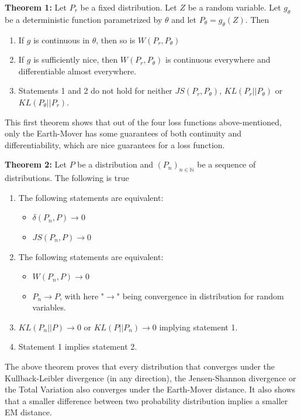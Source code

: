 \documentclass[11pt,a4paper,twoside]{report}
\begin{document}
\textbf{Theorem 1:} Let $P_r$ be a fixed distribution. Let $Z$ be a random variable. Let $g_{\theta}$ be a deterministic function parametrized by $\theta$ and let $P_{\theta} = g_{\theta}(Z)$. Then

\begin{enumerate}
    \item If $g$ is continuous in $\theta$, then so is $W(P_r, P_{\theta})$
    \item If $g$ is sufficiently nice, then $W(P_r, P_{\theta})$ is continuous everywhere and differentiable almost everywhere.
    \item Statements 1 and 2 do not hold for neither $JS(P_r, P_{\theta})$, $KL(P_r||P_{\theta})$ or $KL(P_{\theta}||P_r)$.
\end{enumerate}

This first theorem shows that out of the four loss functions above-mentioned, only the Earth-Mover has some guarantees of both continuity and differentiability, which are nice guarantees for a loss function.

\textbf{Theorem 2:} Let $P$ be a distribution and $(P_n)_{n \in \mathbb{N}}$ be a sequence of distributions. The following is true

\begin{enumerate}
    \item The following statements are equivalent:
    \begin{itemize}
        \item $\delta(P_n, P) \rightarrow 0$
        \item $JS(P_n, P) \rightarrow 0$
    \end{itemize}
    \item The following statements are equivalent:
    \begin{itemize}
        \item $W(P_n, P) \rightarrow 0$
        \item $P_n \rightarrow P$, with here "$\rightarrow$" being convergence in distribution for random variables. 
    \end{itemize}
    \item $KL(P_n||P) \rightarrow 0$ or $KL(P||P_n) \rightarrow 0$ implying statement 1.
    \item Statement 1 implies statement 2.
\end{enumerate}

The above theorem proves that every distribution that converges under the Kullback-Leibler divergence (in any direction), the Jensen-Shannon divergence or the Total Variation also converges under the Earth-Mover distance. It also shows that a smaller difference between two probability distribution implies a smaller EM distance. 
\end{document}
